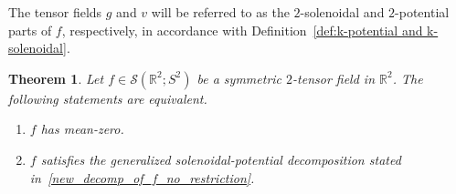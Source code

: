 \documentclass[11pt]{article}
\newcommand{\abs}[1]{\lvert #1 \rvert}
\newcommand{\D}{\mathrm{d}}
\newcommand*{\Rt}{\mathbb{R}^2}
\newcommand{\sch}{\mathcal{S}}
\newtheorem{theorem}{Theorem}[]
\newcommand{\qum}[1]{\quad\mbox{#1}}
\begin{document}
The tensor fields $g$ and $v$ will be referred to as the $2$-solenoidal and $2$-potential parts of $f$, respectively, in accordance with Definition~\ref{def:k-potential and k-solenoidal}.

\begin{theorem}
\label{th:new_decomposition}
 Let $ f \in \mathcal{S}(\mathbb{R}^2;S^2)$ be a symmetric $2$-tensor field in $\Rt$.  The following statements are equivalent.
\begin{enumerate}
        \item \label{A}  $f$ has mean-zero. 
        \item  \label{B}  $f$ satisfies the generalized solenoidal-potential decomposition stated in~\eqref{new_decomp_of_f_no_restriction}.\end{enumerate}
\end{theorem}

\end{document}
